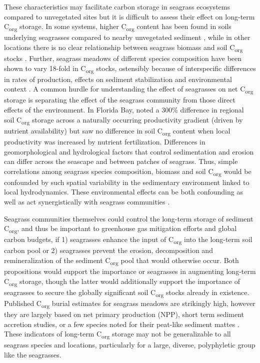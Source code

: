 These characteristics may facilitate carbon storage in seagrass ecosystems compared to unvegetated sites but it is difficult to assess their effect on long-term C\textsubscript{org} storage. In some systems, higher C\textsubscript{org} content has been found in soils underlying seagrasses compared to nearby unvegetated sediment \citep{Greiner:2013wi, Marba:2015hj, Ricart:2015cd}, while in other locations there is no clear relationship between seagrass biomass and soil C\textsubscript{org} stocks \citep{Campbell:2014cv}. Further, seagrass meadows of different species composition have been shown to vary 18-fold in C\textsubscript{org} stocks, ostensibly because of interspecific differences in rates of production, effects on sediment stabilization and environmental context \citep{Lavery:2013kh}. A common hurdle for understanding the effect of seagrasses on net C\textsubscript{org} storage is separating the effect of the seagrass community from those direct effects of the environment. In Florida Bay, \citet{Armitage:2016ek} noted a 300\% difference in regional soil C\textsubscript{org} storage across a naturally occurring productivity gradient (driven by nutrient availability) but saw no difference in soil C\textsubscript{org} content when local productivity was increased by nutrient fertilization. Differences in geomorphological and hydrological factors that control sedimentation and erosion can differ across the seascape and between patches of seagrass. Thus, simple correlations among seagrass species composition, biomass and soil C\textsubscript{org} would be confounded by such spatial variability in the sedimentary environment linked to local hydrodynamics. These environmental effects can be both confounding as well as act synergistically with seagrass communities \citep{Folmer:2012eu}.

Seagrass communities themselves could control the long-term storage of sediment C\textsubscript{org}, and thus be important to greenhouse gas mitigation efforts and global carbon budgets, if 1) seagrasses enhance the input of C\textsubscript{org} into the long-term soil carbon pool or 2) seagrasses prevent the erosion, decomposition and remineralization of the sediment C\textsubscript{org} pool that would otherwise occur. Both propositions would support the importance or seagrasses in augmenting long-term C\textsubscript{org} storage, though the latter would additionally support the importance of seagrasses to secure the globally significant soil C\textsubscript{org} stocks already in existence. Published C\textsubscript{org} burial estimates for seagrass meadows are strikingly high, however they are largely based on net primary production (NPP), short term sediment accretion studies, or a few species noted for their peat-like sediment mattes \citep{Duarte:2005va, Duarte:2010dx}. These indicators of long-term C\textsubscript{org} storage may not be generalizable to all seagrass species and locations, particularly for a large, diverse, polyphyletic group like the seagrasses.

